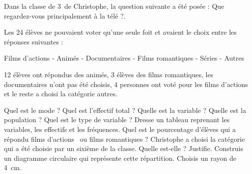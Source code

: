 %
%
    Dans la classe de 3\ieme\ de Christophe, la question suivante a été posée :
    \og Que regardez-vous principalement à la télé ?\fg.

    Les 24 élèves ne pouvaient voter qu'une seule foit et avaient le choix
    entre les réponses suivantes :
    \begin{center}
        Films d'actions - Animés - Documentaires - Films romantiques - Séries
        - Autres
    \end{center}
    12 élèves ont répondus des animés, 3 élèves des films romantiques, les
    documentaires n'ont pas été choisis, 4 personnes ont voté pour les films
    d'actions et le reste a choisi la catégorie autres.
    \begin{tasks}
        \task Quel est le mode ?
        \task Quel est l’effectif total ?
        \task Quelle est la variable ?
        \task Quelle est la population ?
        \task Quel est le type de variable ?
        \task Dresse un tableau reprenant les variables, les effectifs et
        les fréquences.
        \task Quel est le pourcentage d’élèves qui a répondu \og films
        d’actions \fg\ ou \og films romantiques \fg ?
        \task Christophe a choisi la catégorie qui a été choisie par un sixième
        de la classe. Quelle est-elle ? Justifie.
        \task Construis un diagramme circulaire qui représente cette répartition. Choisis un rayon de \SI{4}{cm}.
    \end{tasks}
